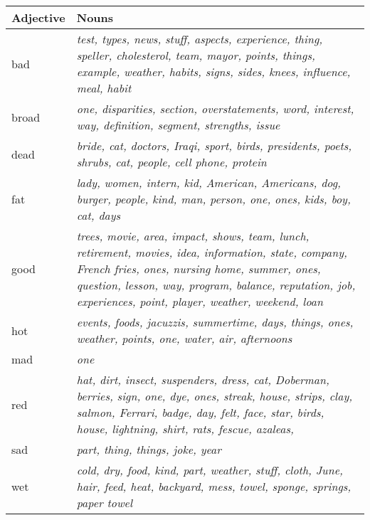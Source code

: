 \documentclass[12pt]{article}
\newenvironment{stylelsTranslation}{\setlength\leftskip{0.748in}\setlength\rightskip{0in plus 1fil}\setlength\parindent{0in}\setlength\parfillskip{0pt plus 1fil}\setlength\parskip{0cm plus 1pt}\writerlistparindent\writerlistleftskip\leavevmode\normalfont\normalsize\writerlistlabel\ignorespaces}{\unskip\vspace{0cm plus 1pt}\par}
\newcommand\writerlistleftskip{}
\newcommand\writerlistparindent{}
\newcommand\writerlistlabel{}
\begin{document}
\begin{flushleft}
\tablefirsthead{}
\tablehead{}
\tabletail{}
\tablelasttail{}
\begin{supertabular}{m{1.0427599in}m{3.5163598in}}
Adjective &
Nouns\\\hline
bad &
\textit{test, types, news, stuff, aspects, experience, thing, speller, cholesterol, team, mayor, points, things, example, weather, habits, signs, sides, knees, influence, meal, habit}\\
broad &
\textit{one, disparities, section, overstatements, word, interest, way, definition, segment, strengths, issue}\\
dead &
\textit{bride, cat, doctors, Iraqi, sport, birds, presidents, poets, shrubs, cat, people, cell phone, protein}\\
fat &
\textit{lady, women, intern, kid, American, Americans, dog, burger, people, kind, man, person, one, ones, kids, boy, cat, days}\\
good &
\textit{trees, movie, area, impact, shows, team, lunch, retirement, movies, idea, information, state, company, French fries, ones, nursing home, summer, ones, question, lesson, way, program, balance, reputation, job, experiences, point, player, weather, weekend, loan}\\
hot &
\textit{events, foods, jacuzzis, summertime, days, things, ones, weather, points, one, water, air, afternoons}\\
mad &
\textit{one}\\
red &
\textit{hat, dirt, insect, suspenders, dress, cat, Doberman, berries, sign, one, dye, ones, streak, house, strips, clay, salmon, Ferrari, badge, day, felt, face, star, birds, house, lightning, shirt, rats, fescue, azaleas, }\\
sad &
\textit{part, thing, things, joke, year }\\
wet &
\textit{cold, dry, food, kind, part, weather, stuff, cloth, June, hair, feed, heat, backyard, mess, towel, sponge, springs, paper towel}\\\hline
\end{supertabular}
\end{flushleft}
\begin{stylelsTranslation}
~
\end{stylelsTranslation}

\clearpage
\end{document}
